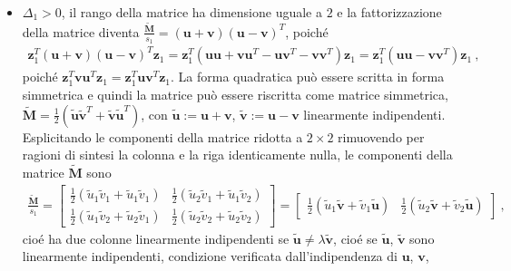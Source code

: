 \documentclass[letterpaper,10pt,italian]{jupyterBook}
\begin{document}
\begin{itemize}
\item {} 
\sphinxAtStartPar
\(\Delta_1 > 0\), il rango della matrice ha dimensione uguale a \(2\) e la fattorizzazione della matrice diventa \(\frac{\widetilde{\mathbf{M}}}{s_1} = ( \mathbf{u} + \mathbf{v})(\mathbf{u} - \mathbf{v})^T\), poiché
\begin{equation*}
\begin{split}\mathbf{z}_1^T ( \mathbf{u} + \mathbf{v})(\mathbf{u} - \mathbf{v})^T \mathbf{z}_1 = \mathbf{z}_1^T \left( \mathbf{u} \mathbf{u} + \mathbf{v}\mathbf{u}^T - \mathbf{u}\mathbf{v}^T - \mathbf{v}\mathbf{v}^T \right) \mathbf{z}_1 = \mathbf{z}_1^T \left( \mathbf{u} \mathbf{u} - \mathbf{v}\mathbf{v}^T \right) \mathbf{z}_1 \ ,\end{split}
\end{equation*}
\sphinxAtStartPar
poiché \(\mathbf{z}_1^T \mathbf{v} \mathbf{u}^T \mathbf{z}_1 = \mathbf{z}_1^T \mathbf{u} \mathbf{v}^T \mathbf{z}_1\). La forma quadratica può essere scritta in forma simmetrica e quindi la matrice può essere riscritta come matrice simmetrica, \(\widetilde{\mathbf{M}} = \frac{1}{2} \left( \widetilde{\mathbf{u}} \widetilde{\mathbf{v}}^T + \widetilde{\mathbf{v}} \widetilde{\mathbf{u}}^T  \right)\), con \(\widetilde{\mathbf{u}} := \mathbf{u} + \mathbf{v}\), \(\widetilde{\mathbf{v}} := \mathbf{u} - \mathbf{v}\) linearmente indipendenti. Esplicitando le componenti della matrice ridotta a \(2 \times 2\) rimuovendo per ragioni di sintesi la colonna e la riga identicamente nulla, le componenti della matrice \(\widetilde{\mathbf{M}}\) sono
\begin{equation*}
\begin{split}\frac{\widetilde{\mathbf{M}}}{s_1} = \begin{bmatrix}
    \frac{1}{2}\left( \widetilde{u}_1 \widetilde{v}_1 + \widetilde{u}_1 \widetilde{v}_1 \right) & 
    \frac{1}{2}\left( \widetilde{u}_2 \widetilde{v}_1 + \widetilde{u}_1 \widetilde{v}_2 \right) \\
    \frac{1}{2}\left( \widetilde{u}_1 \widetilde{v}_2 + \widetilde{u}_2 \widetilde{v}_1 \right) & 
    \frac{1}{2}\left( \widetilde{u}_2 \widetilde{v}_2 + \widetilde{u}_2 \widetilde{v}_2 \right)  
  \end{bmatrix} =
  \begin{bmatrix}
    \frac{1}{2} \left( \widetilde{u}_1 \widetilde{\mathbf{v}} + \widetilde{v}_1 \widetilde{\mathbf{u}} \right) &
    \frac{1}{2} \left( \widetilde{u}_2 \widetilde{\mathbf{v}} + \widetilde{v}_2 \widetilde{\mathbf{u}} \right) 
  \end{bmatrix} \ ,
  \end{split}
\end{equation*}
\sphinxAtStartPar
cioé ha due colonne linearmente indipendenti se \(\widetilde{\mathbf{u}} \ne \lambda \widetilde{\mathbf{v}}\), cioé se \(\widetilde{\mathbf{u}}\), \(\widetilde{\mathbf{v}}\) sono linearmente indipendenti, condizione verificata dall’indipendenza di \(\mathbf{u}\), \(\mathbf{v}\),


\end{itemize}
\end{document}
